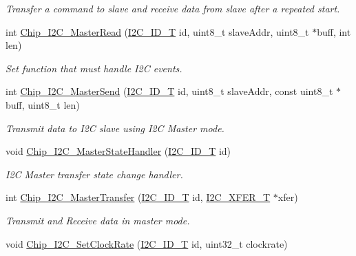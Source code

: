 \begin{DoxyCompactItemize}
\begin{DoxyCompactList}\small\item\em Transfer a command to slave and receive data from slave after a repeated start. \end{DoxyCompactList}\item 
int \hyperlink{group__I2C__17XX__40XX_gae816049843eb162c803b5058ebd9a25c}{Chip\+\_\+\+I2\+C\+\_\+\+Master\+Read} (\hyperlink{group__I2C__17XX__40XX_ga957556a4d900506cd4cba8427afd81e6}{I2\+C\+\_\+\+I\+D\+\_\+T} id, uint8\+\_\+t slave\+Addr, uint8\+\_\+t $\ast$buff, int len)
\begin{DoxyCompactList}\small\item\em Set function that must handle I2C events. \end{DoxyCompactList}\item 
int \hyperlink{group__I2C__17XX__40XX_ga9ff549bdb526786d313c141b11cab43e}{Chip\+\_\+\+I2\+C\+\_\+\+Master\+Send} (\hyperlink{group__I2C__17XX__40XX_ga957556a4d900506cd4cba8427afd81e6}{I2\+C\+\_\+\+I\+D\+\_\+T} id, uint8\+\_\+t slave\+Addr, const uint8\+\_\+t $\ast$buff, uint8\+\_\+t len)
\begin{DoxyCompactList}\small\item\em Transmit data to I2C slave using I2C Master mode. \end{DoxyCompactList}\item 
void \hyperlink{group__I2C__17XX__40XX_ga179362e42a3de931ff7f57ca698254fa}{Chip\+\_\+\+I2\+C\+\_\+\+Master\+State\+Handler} (\hyperlink{group__I2C__17XX__40XX_ga957556a4d900506cd4cba8427afd81e6}{I2\+C\+\_\+\+I\+D\+\_\+T} id)
\begin{DoxyCompactList}\small\item\em I2C Master transfer state change handler. \end{DoxyCompactList}\item 
int \hyperlink{group__I2C__17XX__40XX_ga5f89391d66048894f4365d3b2b7df267}{Chip\+\_\+\+I2\+C\+\_\+\+Master\+Transfer} (\hyperlink{group__I2C__17XX__40XX_ga957556a4d900506cd4cba8427afd81e6}{I2\+C\+\_\+\+I\+D\+\_\+T} id, \hyperlink{structI2C__XFER__T}{I2\+C\+\_\+\+X\+F\+E\+R\+\_\+T} $\ast$xfer)
\begin{DoxyCompactList}\small\item\em Transmit and Receive data in master mode. \end{DoxyCompactList}\item 
void \hyperlink{group__I2C__17XX__40XX_ga17fac5d72058db8eed11d247e78b74ed}{Chip\+\_\+\+I2\+C\+\_\+\+Set\+Clock\+Rate} (\hyperlink{group__I2C__17XX__40XX_ga957556a4d900506cd4cba8427afd81e6}{I2\+C\+\_\+\+I\+D\+\_\+T} id, uint32\+\_\+t clockrate)

\end{DoxyCompactItemize}
